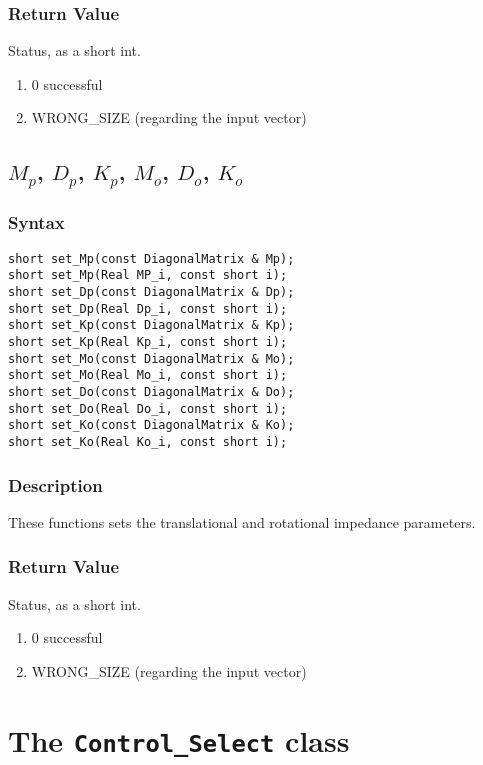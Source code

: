 \documentclass[dvips,11pt,fleqn]{report}
\begin{document}
\subsubsection*{Return Value}

Status, as a short int.
\begin{enumerate}
\item[] 0 successful
\item[] WRONG\_SIZE (regarding the input vector)
\end{enumerate}

\newpage

\subsection*{$M_p$, $D_p$, $K_p$, $M_o$, $D_o$, $K_o$}
\subsubsection*{Syntax}
\begin{verbatim}
short set_Mp(const DiagonalMatrix & Mp);
short set_Mp(Real MP_i, const short i);
short set_Dp(const DiagonalMatrix & Dp);
short set_Dp(Real Dp_i, const short i);
short set_Kp(const DiagonalMatrix & Kp);
short set_Kp(Real Kp_i, const short i);
short set_Mo(const DiagonalMatrix & Mo);
short set_Mo(Real Mo_i, const short i);
short set_Do(const DiagonalMatrix & Do);
short set_Do(Real Do_i, const short i);
short set_Ko(const DiagonalMatrix & Ko);
short set_Ko(Real Ko_i, const short i);
\end{verbatim}

\subsubsection*{Description}   
These functions sets the translational and rotational impedance
parameters.
\subsubsection*{Return Value}

Status, as a short int.
\begin{enumerate}
\item[] 0 successful
\item[] WRONG\_SIZE (regarding the input vector)
\end{enumerate}


\newpage

\section{The \texttt{Control\_Select} class}
\end{document}
